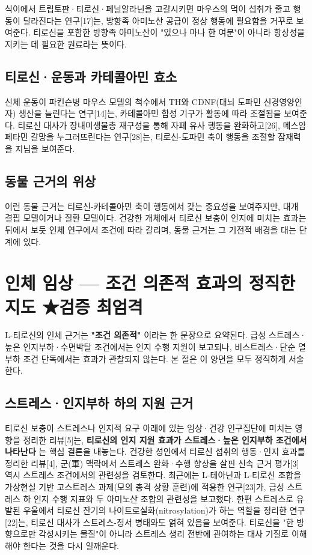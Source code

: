 \documentclass[12pt,oneside]{book}
\begin{document}
식이에서 트립토판·티로신·페닐알라닌을 고갈시키면 마우스의 먹이 섭취가 줄고 행동이 달라진다는 연구[17]는, 방향족 아미노산 공급이 정상 행동에 필요함을 거꾸로 보여준다. 티로신을 포함한 방향족 아미노산이 "있으나 마나 한 여분"이 아니라 항상성을 지키는 데 필요한 원료라는 뜻이다.

\subsection{티로신·운동과 카테콜아민 효소}

신체 운동이 파킨슨병 마우스 모델의 척수에서 TH와 CDNF(대뇌 도파민 신경영양인자) 생산을 늘린다는 연구[14]는, 카테콜아민 합성 기구가 활동에 따라 조절됨을 보여준다. 티로신 대사가 장내미생물총 재구성을 통해 자폐 유사 행동을 완화하고[26], 메스암페타민 갈망을 누그러뜨린다는 연구[28]는, 티로신-도파민 축이 행동을 조절할 잠재력을 지님을 보여준다.

\subsection{동물 근거의 위상}

이런 동물 근거는 티로신-카테콜아민 축이 행동에서 갖는 중요성을 보여주지만, 대개 결핍 모델이거나 질환 모델이다. 건강한 개체에서 티로신 보충이 인지에 미치는 효과는 뒤에서 보듯 인체 연구에서 조건에 따라 갈리며, 동물 근거는 그 기전적 배경을 대는 단계에 있다.

\section{인체 임상 — 조건 의존적 효과의 정직한 지도 ★검증 최엄격}

L-티로신의 인체 근거는 \textbf{"조건 의존적"} 이라는 한 문장으로 요약된다. 급성 스트레스·높은 인지부하·수면박탈 조건에서는 인지 수행 지원이 보고되나, 비스트레스·단순 열부하 조건 단독에서는 효과가 관찰되지 않는다. 본 절은 이 양면을 모두 정직하게 서술한다.

\subsection{스트레스·인지부하 하의 지원 근거}

티로신 보충이 스트레스나 인지적 요구 아래에 있는 임상·건강 인구집단에 미치는 영향을 정리한 리뷰[5]는, \textbf{티로신의 인지 지원 효과가 스트레스·높은 인지부하 조건에서 나타난다} 는 핵심 결론을 내놓는다. 건강한 성인에서 티로신 섭취의 행동·인지 효과를 정리한 리뷰[4], 군(軍) 맥락에서 스트레스 완화·수행 향상을 살핀 신속 근거 평가[3] 역시 스트레스 조건에서의 관련성을 검토한다. 최근에는 L-테아닌과 L-티로신 조합을 가상현실 기반 고스트레스 과제(모의 총격 상황 훈련)에 적용한 연구[23]가, 급성 스트레스 하 인지 수행 지표와 두 아미노산 조합의 관련성을 보고했다. 한편 스트레스로 유발된 우울에서 티로신 잔기의 나이트로실화(nitrosylation)가 하는 역할을 정리한 연구[22]는, 티로신 대사가 스트레스-정서 병태와도 얽혀 있음을 보여준다. 티로신을 "한 방향으로만 각성시키는 물질"이 아니라 스트레스 생리 전반에 관여하는 대사 기질로 이해해야 한다는 것을 다시 일깨운다.
\end{document}
